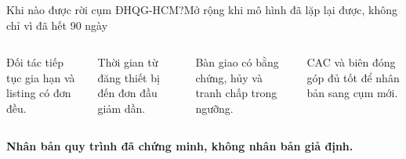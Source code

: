 
\begin{frame}{Khi nào được rời cụm ĐHQG-HCM?}{Mở rộng khi mô hình đã lặp lại được, không chỉ vì đã hết 90 ngày}
  \vspace{.8em}
  \begin{columns}[T,onlytextwidth]
      \par\vspace{.35em}
      Đối tác tiếp tục gia hạn và listing có đơn đều.
      \par\vspace{.35em}
      Thời gian từ đăng thiết bị đến đơn đầu giảm dần.
      \par\vspace{.35em}
      Bàn giao có bằng chứng, hủy và tranh chấp trong ngưỡng.
      \par\vspace{.35em}
      CAC và biên đóng góp đủ tốt để nhân bản sang cụm mới.
  \end{columns}
  \vfill
  \centering\textcolor{mutuxOrange}{\textbf{Nhân bản quy trình đã chứng minh, không nhân bản giả định.}}
\end{frame}
